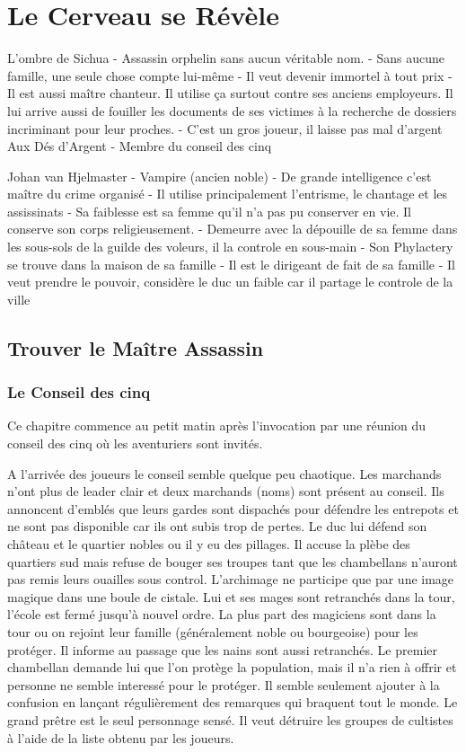 \section{Le Cerveau se Révèle}

L'ombre de Sichua
 - Assassin orphelin sans aucun véritable nom.
 - Sans aucune famille, une seule chose compte lui-même
 - Il veut devenir immortel à tout prix
 - Il est aussi maître chanteur. Il utilise ça surtout contre ses anciens
   employeurs. Il lui arrive aussi de fouiller les documents de ses
   victimes à la recherche de dossiers incriminant pour leur proches.
 - C'est un gros joueur, il laisse pas mal d'argent Aux Dés d'Argent
 - Membre du conseil des cinq


Johan van Hjelmaster
 - Vampire (ancien noble)
 - De grande intelligence c'est maître du crime organisé
 - Il utilise principalement l'entrisme, le chantage et les assissinats
 - Sa faiblesse est sa femme qu'il n'a pas pu conserver en vie. Il conserve son corps religieusement.
 - Demeurre avec la dépouille de sa femme dans les sous-sols de la guilde des voleurs, il la controle 
   en sous-main
 - Son Phylactery se trouve dans la maison de sa famille
 - Il est le dirigeant de fait de sa famille
 - Il veut prendre le pouvoir, considère le duc un faible car il partage le controle de la ville

\subsection{Trouver le Maître Assassin}

\subsubsection*{Le Conseil des cinq}

Ce chapitre commence au petit matin après l'invocation par une réunion du 
conseil des cinq où les aventuriers sont invités.

A l'arrivée des joueurs le conseil semble quelque peu chaotique. Les marchands 
n'ont plus de leader clair et deux marchands (noms) sont présent au conseil. 
Ils annoncent d'emblés que leurs gardes sont dispachés pour défendre les entrepots
et ne sont pas disponible car ils ont subis trop de pertes. Le duc lui défend 
son château et le quartier nobles ou il y eu des pillages. Il accuse la plèbe des 
quartiers sud mais refuse de bouger ses troupes tant que les chambellans n'auront
pas remis leurs ouailles sous control. L'archimage ne participe que par une image 
magique dans une boule de cistale. Lui et ses mages sont retranchés dans la tour,
l'école est fermé jusqu'à nouvel ordre. La plus part des magiciens sont dans la tour
ou on rejoint leur famille (généralement noble ou bourgeoise) pour les protéger. 
Il informe au passage que les nains sont aussi retranchés. Le premier chambellan 
demande lui que l'on protège la population, mais il n'a rien à offrir et personne 
ne semble interessé pour le protéger. Il semble seulement ajouter à la confusion
en lançant régulièrement des remarques qui braquent tout le monde. Le grand prêtre 
est le seul personnage sensé. Il veut détruire les groupes de cultistes à l'aide 
de la liste obtenu par les joueurs. 

